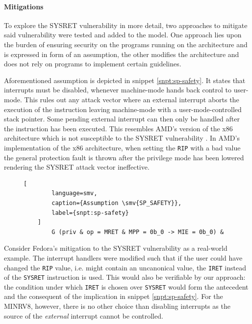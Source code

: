 \paragraph{Mitigations}

To explore the SYSRET vulnerability in more detail, two approaches to mitigate said vulnerability were tested and added to the model.
One approach lies upon the burden of ensuring security on the programs running on the architecture and is expressed in form of an assumption, the other modifies the architecture and does not rely on programs to implement certain guidelines.

Aforementioned assumption is depicted in snippet \ref{snpt:sp-safety}.
It states that interrupts must be disabled, whenever machine-mode hands back control to user-mode.
This rules out any attack vector where an external interrupt aborts the execution of the  instruction leaving machine-mode with a user-mode-controlled stack pointer.
Some pending external interrupt can then only be handled after the  instruction has been executed.
This resembles AMD's version of the x86 architecture which is not susceptible to the SYSRET vulnerability \cite{Dunlap19}.
In AMD's implementation of the x86 architecture, when setting the \lstinline{RIP} with a bad value the general protection fault is thrown after the privilege mode has been lowered rendering the SYSRET attack vector ineffective.

\begin{figure}
    \begin{lstlisting}[
        language=smv,
        caption={Assumption \smv{SP_SAFETY}},
        label={snpt:sp-safety}
    ]
        G (priv & op = MRET & MPP = 0b_0 -> MIE = 0b_0) &
    \end{lstlisting}
\end{figure}

Consider Fedora's mitigation to the SYSRET vulnerability \cite{FedoraSysretMit} as a real-world example.
The interrupt handlers were modified such that if the user could have changed the \lstinline{RIP} value, i.e. might contain an uncanonical value, the \lstinline{IRET} instead of the \lstinline{SYSRET} instruction is used.
This would also be verifiable by our approach: the condition under which \lstinline{IRET} is chosen over \lstinline{SYSRET} would form the antecedent and  the consequent of the implication in snippet \ref{snpt:sp-safety}.
For the MINRV8, however, there is no other choice than disabling interrupts as the source of the \textit{external} interrupt cannot be controlled.

